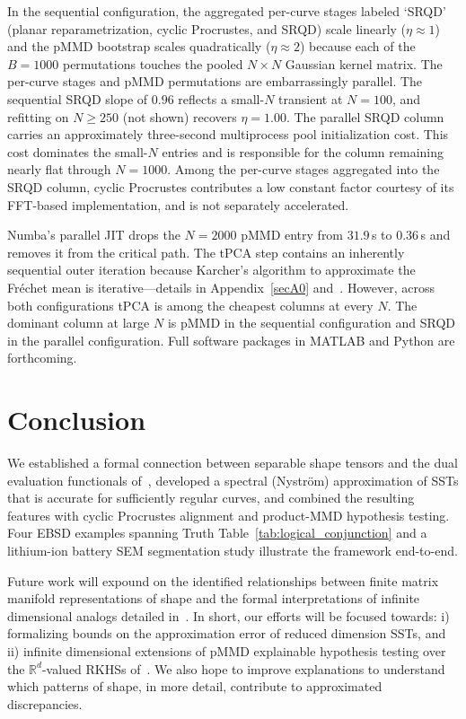 \documentclass[pdflatex,iicol]{sn-jnl}%
\theoremstyle{thmstyleone}%
\theoremstyle{thmstyletwo}%
\theoremstyle{thmstylethree}%
\begin{document}
In the sequential configuration, the aggregated per-curve stages labeled `SRQD' (planar reparametrization, cyclic Procrustes, and SRQD) scale linearly ($\eta\approx 1$) and the pMMD bootstrap scales quadratically ($\eta\approx 2$) because each of the $B=1000$ permutations touches the pooled $N\times N$ Gaussian kernel matrix. The per-curve stages and pMMD permutations are embarrassingly parallel. The sequential SRQD slope of $0.96$ reflects a small-$N$ transient at $N=100$, and refitting on $N \geq 250$ (not shown) recovers $\eta = 1.00$. The parallel SRQD column carries an approximately three-second multiprocess pool initialization cost. This cost dominates the small-$N$ entries and is responsible for the column remaining nearly flat through $N=1000$. Among the per-curve stages aggregated into the SRQD column, cyclic Procrustes contributes a low constant factor courtesy of its FFT-based implementation, and is not separately accelerated.

Numba's parallel JIT drops the $N=2000$ pMMD entry from $31.9$\,s to $0.36$\,s and removes it from the critical path. The tPCA step contains an inherently sequential outer iteration because Karcher's algorithm to approximate the Fr\'echet mean is iterative---details in Appendix~\ref{secA0} and~\cite{grey2023separable}. However, across both configurations tPCA is among the cheapest columns at every $N$. The dominant column at large $N$ is pMMD in the sequential configuration and SRQD in the parallel configuration. Full software packages in MATLAB and Python are forthcoming.

\section{Conclusion}\label{sec:conclude}
We established a formal connection between separable shape tensors and the dual evaluation functionals of~\cite{micheli2013matrix}, developed a spectral (Nystr\"om) approximation of SSTs that is accurate for sufficiently regular curves, and combined the resulting features with cyclic Procrustes alignment and product-MMD hypothesis testing. Four EBSD examples spanning Truth Table~\ref{tab:logical_conjunction} and a lithium-ion battery SEM segmentation study illustrate the framework end-to-end.

Future work will expound on the identified relationships between finite matrix manifold representations of shape and the formal interpretations of infinite dimensional analogs detailed in~\cite{micheli2013matrix}. In short, our efforts will be focused towards: i) formalizing bounds on the approximation error of reduced dimension SSTs, and ii) infinite dimensional extensions of pMMD explainable hypothesis testing over the $\mathbb{R}^d$-valued RKHSs of~\cite{micheli2013matrix}. We also hope to improve explanations to understand which patterns of shape, in more detail, contribute to approximated discrepancies.
\end{document}
